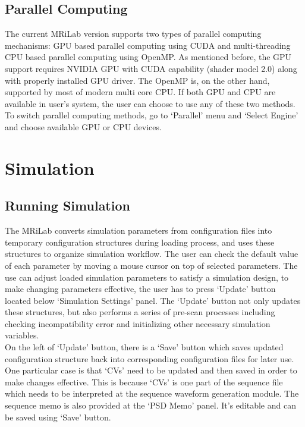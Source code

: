 \documentclass{book}%
\begin{document}
\section{Parallel Computing}

The current MRiLab version supports two types of parallel computing mechanisms: GPU based parallel computing using CUDA and multi-threading CPU based parallel computing using OpenMP. As mentioned before, the GPU support requires NVIDIA GPU with CUDA capability (shader model 2.0) along with properly installed GPU driver. The OpenMP is, on the other hand, supported by most of modern multi core CPU. If both GPU and CPU are available in user's system, the user can choose to use any of these two methods. To switch parallel computing methods, go to `Parallel' menu and `Select Engine' and choose available GPU or CPU devices.

\chapter{Simulation}

\section{Running Simulation}

The MRiLab converts simulation parameters from configuration files into temporary configuration structures during loading process, and uses these structures to organize simulation workflow. The user can check the default value of each parameter by moving a mouse cursor on top of selected parameters. The use can adjust loaded simulation parameters to satisfy a simulation design, to make changing parameters effective, the user has to press `Update' button located below `Simulation Settings' panel. The `Update' button not only updates these structures, but also performs a series of pre-scan processes including checking incompatibility error and initializing other necessary simulation variables. \\

On the left of `Update' button, there is a `Save' button which saves updated configuration structure back into corresponding configuration files for later use. One particular case is that `CVs' need to be updated and then saved in order to make changes effective. This is because `CVs' is one part of the sequence file which needs to be interpreted at the sequence waveform generation module. The sequence memo is also provided at the `PSD Memo' panel. It's editable and can be saved using `Save' button. \\
\end{document}
